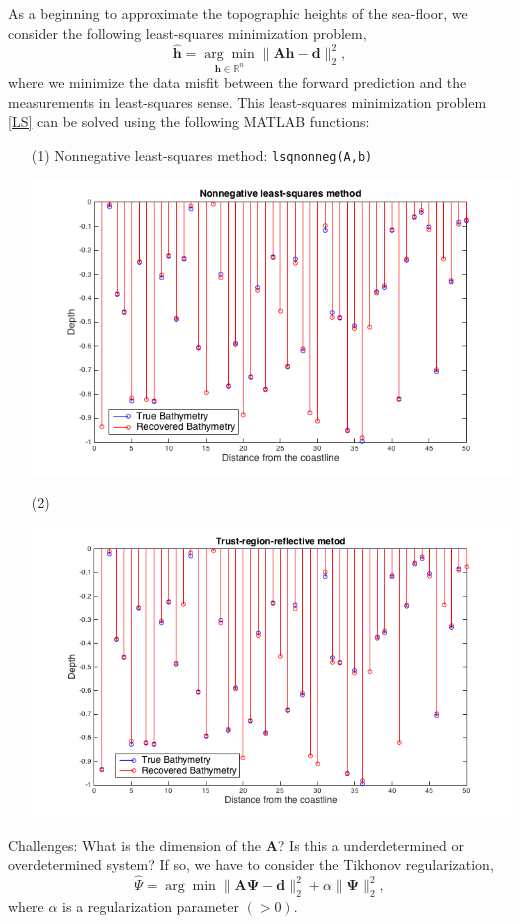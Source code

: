 As a beginning to approximate the topographic heights of the sea-floor,  we consider the following least-squares minimization problem,
\begin{equation}\label{LS}
\mathbf{\hat{h}}= \underset{\mathbf{h} \in \mathbb{R}^n}{\arg \min} \|  \mathbf{A}\mathbf{h} -  \mathbf{d} \|_2^2,
\end{equation}
where we minimize the data misfit between the forward prediction and the measurements in least-squares sense. 
This least-squares minimization problem \eqref{LS} can be solved using the following  MATLAB functions:
\begin{itemize}
\item[(1)]  Nonnegative least-squares method:  \verb|lsqnonneg(A,b)|  \\
\begin{center}
\includegraphics[scale=0.55]{img/NonLS.png} 
\end{center}
\item[(2)]  
\begin{center}
\includegraphics[scale=0.55]{img/trust_region.png} 
\end{center}

\end{itemize}
Challenges: What is the dimension of the $\mathbf{A}$? Is this a underdetermined or overdetermined system? If so, we have to consider the Tikhonov regularization,
$$
\hat{\Psi} = {\arg \min} \|  \mathbf{A}\mathbf{\Psi} -  \mathbf{d} \|_2^2  +  \alpha \| \mathbf{\Psi}\|_2^2,
$$
where $\alpha$ is a regularization parameter $(>0)$. 


